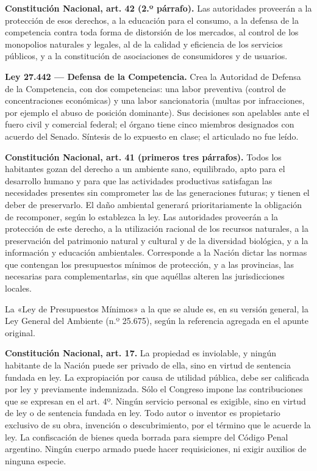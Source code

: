 \documentclass[12pt,oneside]{book}
\begin{document}
\begin{note}
\textbf{Constitución Nacional, art. 42 (2.º párrafo).} Las autoridades proveerán a la protección de esos derechos, a la educación para el consumo, a la defensa de la competencia contra toda forma de distorsión de los mercados, al control de los monopolios naturales y legales, al de la calidad y eficiencia de los servicios públicos, y a la constitución de asociaciones de consumidores y de usuarios.
\end{note}

\begin{note}
\textbf{Ley 27.442 --- Defensa de la Competencia.} Crea la Autoridad de Defensa de la Competencia, con dos competencias: una labor preventiva (control de concentraciones económicas) y una labor sancionatoria (multas por infracciones, por ejemplo el abuso de posición dominante). Sus decisiones son apelables ante el fuero civil y comercial federal; el órgano tiene cinco miembros designados con acuerdo del Senado. Síntesis de lo expuesto en clase; el articulado no fue leído.
\end{note}

\begin{note}
\textbf{Constitución Nacional, art. 41 (primeros tres párrafos).} Todos los habitantes gozan del derecho a un ambiente sano, equilibrado, apto para el desarrollo humano y para que las actividades productivas satisfagan las necesidades presentes sin comprometer las de las generaciones futuras; y tienen el deber de preservarlo. El daño ambiental generará prioritariamente la obligación de recomponer, según lo establezca la ley. Las autoridades proveerán a la protección de este derecho, a la utilización racional de los recursos naturales, a la preservación del patrimonio natural y cultural y de la diversidad biológica, y a la información y educación ambientales. Corresponde a la Nación dictar las normas que contengan los presupuestos mínimos de protección, y a las provincias, las necesarias para complementarlas, sin que aquéllas alteren las jurisdicciones locales.

La «Ley de Presupuestos Mínimos» a la que se alude es, en su versión general, la Ley General del Ambiente (n.º 25.675), según la referencia agregada en el apunte original.
\end{note}

\begin{note}
\textbf{Constitución Nacional, art. 17.} La propiedad es inviolable, y ningún habitante de la Nación puede ser privado de ella, sino en virtud de sentencia fundada en ley. La expropiación por causa de utilidad pública, debe ser calificada por ley y previamente indemnizada. Sólo el Congreso impone las contribuciones que se expresan en el art. 4º. Ningún servicio personal es exigible, sino en virtud de ley o de sentencia fundada en ley. Todo autor o inventor es propietario exclusivo de su obra, invención o descubrimiento, por el término que le acuerde la ley. La confiscación de bienes queda borrada para siempre del Código Penal argentino. Ningún cuerpo armado puede hacer requisiciones, ni exigir auxilios de ninguna especie.
\end{note}
\end{document}
